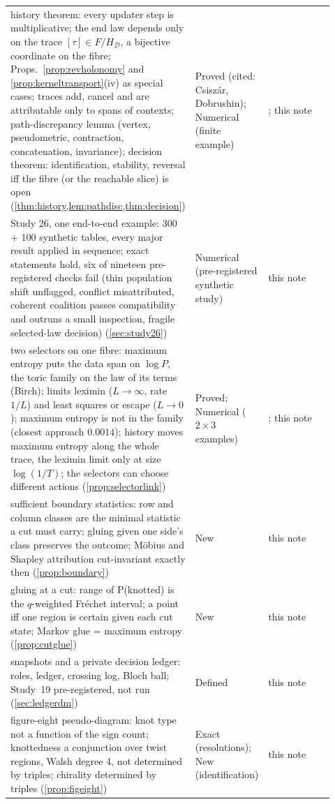 \documentclass[11pt]{article}
\theoremstyle{definition}\newtheorem{definition}[theorem]{Definition}\newtheorem{remark}[theorem]{Remark}\newtheorem{example}[theorem]{Example}\newtheorem{problem}[theorem]{Open problem}\crefname{problem}{Problem}{Problems}
\begin{document}
{\begin{longtable}{p{0.46\linewidth}p{0.16\linewidth}p{0.3\linewidth}}
\rowcolor{stNew} history theorem: every updater step is multiplicative; the end law depends only on the trace $[\tau]\in F/H_{\mathcal D}$, a bijective coordinate on the fibre; Props.~\ref{prop:revholonomy} and \ref{prop:kerneltransport}(iv) as special cases; traces add, cancel and are attributable only to spans of contexts; path-discrepancy lemma (vertex, pseudometric, contraction, concatenation, invariance); decision theorem: identification, stability, reversal iff the fibre (or the reachable slice) is open (\cref{thm:history,lem:pathdisc,thm:decision}) & Proved (cited: Csisz\'ar, Dobrushin); Numerical (finite example) & \cite{Csiszar1975,Dobrushin1956}; this note\\
\rowcolor{stNew} Study 26, one end-to-end example: 300 + 100 synthetic tables, every major result applied in sequence; exact statements hold, six of nineteen pre-registered checks fail (thin population shift unflagged, conflict misattributed, coherent coalition passes compatibility and outruns a small inspection, fragile selected-law decision) (\cref{sec:study26}) & Numerical (pre-registered synthetic study) & this note\\
\rowcolor{stNew} two selectors on one fibre: maximum entropy puts the data span on $\log P$, the toric family on the law of its terms (Birch); limits leximin ($L\to\infty$, rate $1/L$) and least squares or escape ($L\to0$); maximum entropy is not in the family (closest approach $0.0014$); history moves maximum entropy along the whole trace, the leximin limit only at size $\log(1/T)$; the selectors can choose different actions (\cref{prop:selectorlink}) & Proved; Numerical ($2\times3$ examples) & \cite{Csiszar1975}; this note\\
\rowcolor{stNew} sufficient boundary statistics: row and column classes are the minimal statistic a cut must carry; gluing given one side's class preserves the outcome; Möbius and Shapley attribution cut-invariant exactly then (\cref{prop:boundary}) & New & this note\\
\rowcolor{stNew} gluing at a cut: range of P(knotted) is the $q$-weighted Fr\'echet interval; a point iff one region is certain given each cut state; Markov glue = maximum entropy (\cref{prop:cutglue}) & New & this note\\
\rowcolor{stNew} snapshots and a private decision ledger: roles, ledger, crossing log, Bloch ball; Study~19 pre-registered, not run (\cref{sec:ledgerdm}) & Defined & this note\\
\rowcolor{stNew} figure-eight pseudo-diagram: knot type not a function of the sign count; knottedness a conjunction over twist regions, Walsh degree 4, not determined by triples; chirality determined by triples (\cref{prop:figeight}) & Exact (resolutions); New (identification) & this note\\

\end{longtable}}
\end{document}
